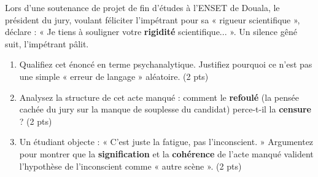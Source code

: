 \documentclass[11pt]{article}
\begin{document}
\begin{exercice}
Lors d'une soutenance de projet de fin d'études à l'ENSET de Douala, le président du jury, voulant féliciter l'impétrant pour sa « rigueur scientifique », déclare : « Je tiens à souligner votre \textbf{rigidité} scientifique... ». Un silence gêné suit, l'impétrant pâlit.
\begin{enumerate}
    \item Qualifiez cet énoncé en terme psychanalytique. Justifiez pourquoi ce n'est pas une simple « erreur de langage » aléatoire. (2 pts)
    \item Analysez la structure de cet acte manqué : comment le \textbf{refoulé} (la pensée cachée du jury sur la manque de souplesse du candidat) perce-t-il la \textbf{censure} ? (2 pts)
    \item Un étudiant objecte : « C'est juste la fatigue, pas l'inconscient. » Argumentez pour montrer que la \textbf{signification} et la \textbf{cohérence} de l'acte manqué valident l'hypothèse de l'inconscient comme « autre scène ». (2 pts)
\end{enumerate}
\end{exercice}
\end{document}
